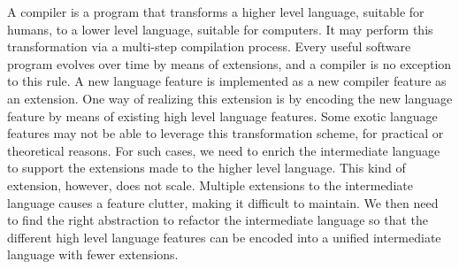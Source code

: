 \documentclass[screen,nonacm]{acmart}
\begin{document}
A compiler is a program that transforms a higher level language, suitable for
humans, to a lower level language, suitable for computers. It may
perform this transformation via a multi-step compilation
process\cite{essentials_siek_2023}. Every useful software program
evolves over time by means of extensions, and a compiler is no
exception to this rule. A new language feature is implemented
as a new compiler feature as an extension. One way of realizing this
extension is by encoding the new language feature by means of existing high
level language features. Some exotic language features may
not be able to leverage this transformation scheme,
for practical or theoretical reasons. For such cases, we need to
enrich the intermediate language to support
the extensions made to the higher level language. This kind of
extension, however, does not scale. Multiple extensions to
the intermediate language causes a feature clutter, making it
difficult to maintain. We then need to find the right abstraction to refactor
the intermediate language so that the different high level language features can be
encoded into a unified intermediate language with fewer extensions.
\end{document}
